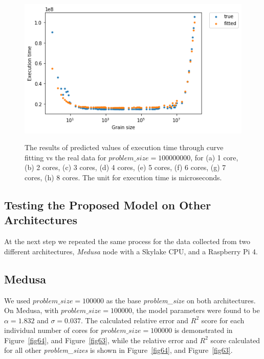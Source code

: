 \begin{figure}[H]
	{\centering\includegraphics[scale=.35]{images/hpx_for_loop/fitted/100000/marvin_100000000_7_100000.png}	
		\label{fig62:g}}
	\hfill
	\caption{The results of predicted values of execution time through curve fitting vs the real data for $problem\_size=100000000$, for (a) 1 core, (b) 2 cores, (c) 3 cores, (d) 4 cores, (e) 5 cores, (f) 6 cores, (g) 7 cores, (h) 8 cores. The unit for execution time is microseconds.}
	\label{fig62}	
\end{figure}


\subsection{Testing the Proposed Model on Other Architectures}

At the next step we repeated the same process for the data collected from two different architectures, \textit{Medusa} node with a Skylake CPU, and a Raspberry Pi 4.

\subsection{Medusa}
We used $problem\_{size}=100000$ as the base \emph{problem\_{size}} on both architectures. On Medusa, with $problem\_{size}=100000$, the model parameters were found to be $\alpha=1.832$ and $\sigma=0.037$. 
The calculated relative error and $R^2$ score for each individual number of cores for $problem\_{size}=100000$ is demonstrated in Figure~\ref{fig64}, and Figure~\ref{fig63}, while the relative error and $R^2$ score calculated for all other \emph{problem\_{sizes}} is shown in Figure~\ref{fig64}, and Figure~\ref{fig63}.
\vspace{\baselineskip}

